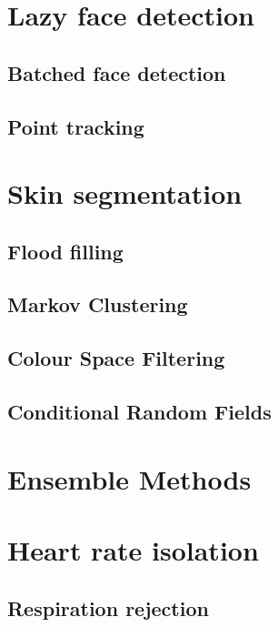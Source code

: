 \section{Lazy face detection}
\subsection{Batched face detection}
\subsection{Point tracking}
\subsection{}

\section{Skin segmentation}
\subsection{}
\subsection{}
\subsection{Flood filling}
\subsection{Markov Clustering}

\subsection{Colour Space Filtering}
\subsubsection{}

\subsection{Conditional Random Fields}

\section{Ensemble Methods}

\section{Heart rate isolation}
\subsection{Respiration rejection}